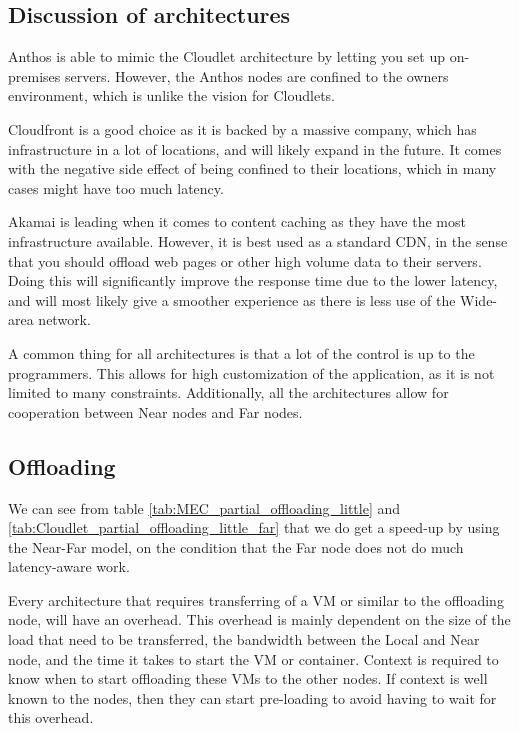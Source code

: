 \subsection{Discussion of architectures}
Anthos is able to mimic the Cloudlet architecture by letting you set up on-premises servers. However, the Anthos nodes are confined to the owners environment, which is unlike the vision for Cloudlets. 

Cloudfront is a good choice as it is backed by a massive company, which has infrastructure in a lot of locations, and will likely expand in the future. It comes with the negative side effect of being confined to their locations, which in many cases might have too much latency.

Akamai is leading when it comes to content caching as they have the most infrastructure available. However, it is best used as a standard CDN, in the sense that you should offload web pages or other high volume data to their servers. Doing this will significantly improve the response time due to the lower latency, and will most likely give a smoother experience as there is less use of the Wide-area network.

A common thing for all architectures is that a lot of the control is up to the programmers. This allows for high customization of the application, as it is not limited to many constraints. Additionally, all the architectures allow for cooperation between Near nodes and Far nodes. 


\subsection{Offloading}
We can see from table \ref{tab:MEC_partial_offloading_little} and \ref{tab:Cloudlet_partial_offloading_little_far} that we do get a speed-up by using the Near-Far model, on the condition that the Far node does not do much latency-aware work. 

Every architecture that requires transferring of a VM or similar to the offloading node, will have an overhead. This overhead is mainly dependent on the size of the load that need to be transferred, the bandwidth between the Local and Near node, and the time it takes to start the VM or container. Context is required to know when to start offloading these VMs to the other nodes. If context is well known to the nodes, then they can start pre-loading to avoid having to wait for this overhead.







